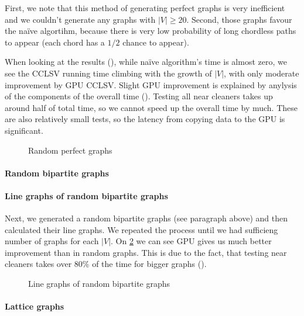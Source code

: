 First, we note that this method of generating perfect graphs is very inefficient and we couldn't generate any graphs with $|V| \geq 20$. Second, those graphs favour the na\"ive algortihm, because there is very low probability of long chordless paths to appear (each chord has a $1/2$ chance to appear).

When looking at the results (), while na\"ive algorithm's time is almost zero, we see the CCLSV running time climbing with the growth of $|V|$, with only moderate improvement by GPU CCLSV. Slight GPU improvement is explained by anylysis of the components of the overall time (). Testing all near cleaners takes up around half of total time, so we cannot speed up the overall time by much. These are also relatively small tests, so the latency from copying data to the GPU is significant.


\begin{figure}
  \centering
  
  \label{plot:perfLines}
  \caption{Random perfect graphs}
\end{figure}

\paragraph{Random bipartite graphs}

\paragraph{Line graphs of random bipartite graphs}
Next, we generated a random bipartite graphs (see paragraph above) and then calculated their line graphs. We repeated the process until we had sufficieng number of graphs for each $|V|$. On \cref{plot:perf2Lines} we can see GPU gives us much better improvement than in random graphs. This is due to the fact, that testing near cleaners takes over 80\% of the time for bigger graphs ().

\begin{figure}
  \centering
  
  \label{plot:perf2Lines}
  \caption{Line graphs of random bipartite graphs}
\end{figure}

\paragraph{Lattice graphs}

